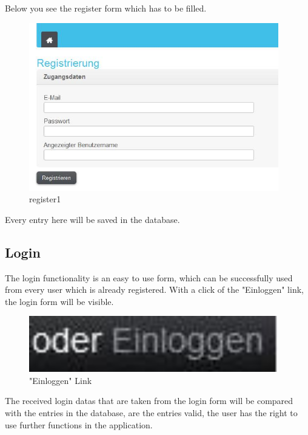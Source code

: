 Below you see the register form which has to be filled.

\begin{figure}[!ht]
  \centering
    \includegraphics[width=0.97\textwidth]{images/basic_functionalities/register_form.jpg}
  \caption{register1}
  \label{fig:register1}
\end{figure}

Every entry here will be saved in the database.

\subsection{Login}

The login functionality is an easy to use form, which can be successfully used from every user which is already 
registered. With a click of the "Einloggen" link, the login form will be visible.

\begin{figure}[!ht]
  \centering
    \includegraphics[width=0.97\textwidth]{images/basic_functionalities/oderEinloggen.jpg}
  \caption{"Einloggen" Link}
  \label{fig:einloggen}
\end{figure}

The received login datas that are taken from the login form will be compared with the entries in the database, are the 
entries valid, the user has the right to use further functions in the application.

